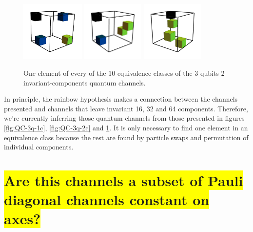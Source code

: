 \documentclass[11pt,dvipsnames]{article} %
\newcommand{\h}[1]{\colorbox{Yellow}{#1}}
\newcommand{\1}{\mathds{1}}
\begin{document}
\begin{figure}[H]
	\hfill
	\includegraphics[height=3cm]{img/3q-4c-no-3}
	\hfill
	\includegraphics[height=3cm]{img/3q-4c-no-4}
	\hfill
	\includegraphics[height=3cm]{img/3q-4c-no-5}
	\hfill \hfill
	\caption{One element of every of the 10 equivalence
	classes of the 3-qubits 2-invariant-components quantum channels.}
	\label{fig:QC-3q-4c}
\end{figure}

In principle, the rainbow hypothesis makes a connection between the 
channels presented and channels that leave invariant 16, 32 and 64
components. Therefore, we're currently inferring those quantum channels
from those presented in figures \ref{fig:QC-3q-1c}, \ref{fig:QC-3q-2c} and
\ref{fig:QC-3q-4c}. It is only necessary to find one element in an 
equivalence class because the rest are found by particle swaps 
and permutation of individual components.

\section*{\h{Are this channels a subset of Pauli diagonal channels constant
on axes?}}
\end{document}
